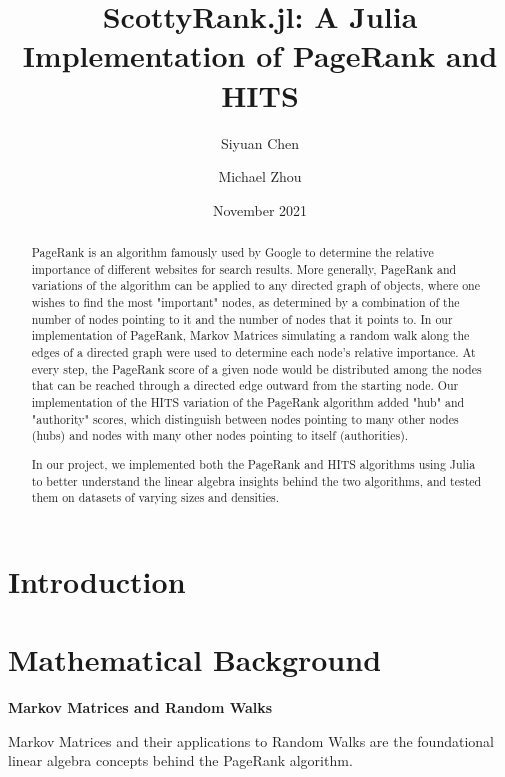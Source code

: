 \documentclass[12pt, titlepage, twoside]{amsart}
\theoremstyle{remark}
\begin{document}
\title[ScottyRank.jl]{ScottyRank.jl: A Julia Implementation of PageRank and HITS}

\author{Siyuan Chen}
\author{Michael Zhou}
\date{November 2021}

\begin{abstract}
PageRank is an algorithm famously used by Google to determine the relative importance of different websites for search results. More generally, PageRank and variations of the algorithm can be applied to any directed graph of objects, where one wishes to find the most "important" nodes, as determined by a combination of the number of nodes pointing to it and the number of nodes that it points to. In our implementation of PageRank, Markov Matrices simulating a random walk along the edges of a directed graph were used to determine each node's relative importance. At every step, the PageRank score of a given node would be distributed among the nodes that can be reached through a directed edge outward from the starting node. Our implementation of the HITS variation of the PageRank algorithm added "hub" and "authority" scores, which distinguish between nodes pointing to many other nodes (hubs) and nodes with many other nodes pointing to itself (authorities).

In our project, we implemented both the PageRank and HITS algorithms using Julia to better understand the linear algebra insights behind the two algorithms, and tested them on datasets of varying sizes and densities.

\end{abstract}

\maketitle

\tableofcontents

\section{Introduction}


\section{Mathematical Background}

\textbf{Markov Matrices and Random Walks}

Markov Matrices and their applications to Random Walks are the foundational linear algebra concepts behind the PageRank algorithm.
\end{document}
